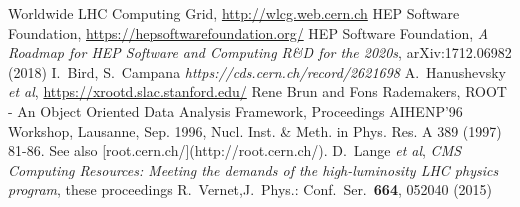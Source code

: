 \begin{thebibliography}{}
Worldwide LHC Computing Grid, \url{http://wlcg.web.cern.ch}
HEP Software Foundation, \url{https://hepsoftwarefoundation.org/}
HEP Software Foundation, \textit{A Roadmap for HEP Software and Computing R\&D for the 2020s}, arXiv:1712.06982 (2018)
I.~Bird, S.~Campana \textit{https://cds.cern.ch/record/2621698}
A.~Hanushevsky {\em et al}, \url{https://xrootd.slac.stanford.edu/}
Rene Brun and Fons Rademakers, ROOT - An Object Oriented Data Analysis Framework,
Proceedings AIHENP'96 Workshop, Lausanne, Sep. 1996, Nucl. Inst. \& Meth. in Phys. Res. A 389 (1997) 81-86. See also [root.cern.ch/](http://root.cern.ch/).
D.~Lange {\em et al}, \textit{CMS Computing Resources: Meeting the demands of the high-luminosity LHC physics program}, these proceedings
R.~Vernet,J.\ Phys.: Conf.\ Ser.\ \textbf{664}, 052040 (2015)
\end{thebibliography}
